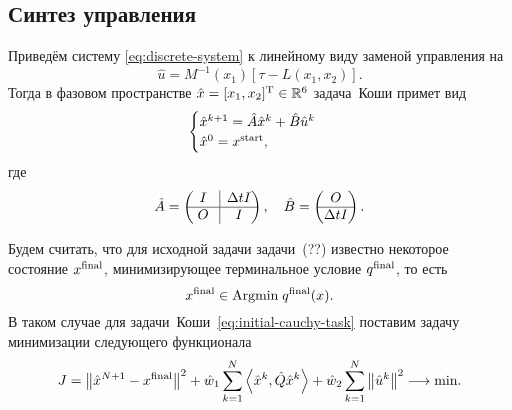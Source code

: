 \documentclass[../../doc.tex]{subfiles}
\begin{document}
    \subsection{Синтез управления}

    Приведём систему \eqref{eq:discrete-system} к линейному виду заменой управления на
    \begin{equation}\label{eq:initial-control-definition}
        \hat u = M^{-1}(x_1)[\tau - L(x_1, x_2)].
    \end{equation}
    Тогда в фазовом пространстве $\hat x = [x_1, x_2]^\textnormal{T} \in \mathbb{R}^{6}$ задача~Коши примет вид
    \begin{equation}\label{eq:initial-cauchy-task}
        \begin{cases}
            \hat x^{k+1} = \hat A \hat x^{k} + \hat B \hat u^{k}
            \\
            \hat x^{0} = x^{\textnormal{start}},
        \end{cases}
    \end{equation}
    где
    \begin{equation*}
        \hat A
        =
        \begin{pmatrix}
            \;I\; & \hspace*{-\arraycolsep}\vline\hspace*{-\arraycolsep} & \Delta t I
            \\
            \hline
            \;O\; & \hspace*{-\arraycolsep}\vline\hspace*{-\arraycolsep} & I
        \end{pmatrix}
        ,\quad
        \hat B
        =
        \begin{pmatrix}
            O
            \\
            \hline
            \Delta t I
        \end{pmatrix}
        .
    \end{equation*}

    Будем считать, что для исходной задачи задачи~(??) известно некоторое состояние $x^{\textnormal{final}}$, минимизирующее терминальное условие $q^{\textnormal{final}}$, то есть
    \begin{equation*}\label{eq:initial-x-final-definition}
        x^{\textnormal{final}} \in \textnormal{Argmin}\; q^{\textnormal{final}}(x).
    \end{equation*}
    В таком случае для задачи~Коши~\eqref{eq:initial-cauchy-task} поставим задачу минимизации следующего функционала
    \begin{equation}\label{eq:initial-cost-definition}
        J
        =
            \left\| \hat x^{N+1} - x^{\textnormal{final}} \right\|^2
            +
            \hat w_1 \sum_{k=1}^{N} \left\langle \hat x^k, \hat Q \hat x^k \right\rangle
            +
            \hat w_2 \sum_{k=1}^{N} \left\| \hat u^k \right\|^2
        \longrightarrow
        \textnormal{min}.
    \end{equation}
    
\end{document}
